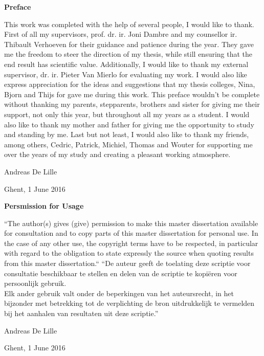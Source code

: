 \newpage

\noindent \textbf{\huge Preface}

\vspace{1.5cm}

\noindent

This work was completed with the help of several people, I would like to thank. First of all my supervisors, prof. dr. ir. Joni Dambre and my counsellor ir. Thibault Verhoeven for their guidance and patience during the year. They gave me the freedom to steer the direction of my thesis, while still ensuring that the end result has scientific value. Additionally, I would like to thank my external supervisor, dr. ir. Pieter Van Mierlo for evaluating my work. I would also like express appreciation for the ideas and suggestions that my thesis colleges, Nina, Bjorn and Thijs for gave me during this work.
\npar
This preface wouldn't be complete without thanking my parents, stepparents, brothers and sister for giving me their support, not only this year, but throughout all my years as a student. I would also like to thank my mother and father for giving me the opportunity to study and standing by me.
\npar
Last but not least, I would also like to thank my friends, among others, Cedric, Patrick, Michiel, Thomas and Wouter for supporting me over the years of my study and creating a pleasant working atmosphere. 

\addvspace{3cm}

\hfill \noindent Andreas De Lille

\hfill \noindent Ghent, 1 June 2016

\clearpage

\noindent \textbf{\huge Persmission for Usage}
\vspace{1.5cm}

\noindent
``The author(s) gives (give) permission to make this master dissertation available for consultation
and to copy parts of this master dissertation for personal use.
 In the case of any other use, the copyright terms have to be respected, in particular with regard to
the obligation to state expressly the source when quoting results from this master dissertation.``
\npar
``De auteur geeft de toelating deze scriptie voor consultatie beschikbaar
te stellen en delen van de scriptie te kopi\"eren voor persoonlijk
gebruik.\\
Elk ander gebruik valt onder de beperkingen van het auteursrecht,
in het bijzonder met betrekking tot de verplichting de bron uitdrukkelijk
te vermelden bij het aanhalen van resultaten uit deze scriptie.''

\addvspace{4cm}

\hfill \noindent Andreas De Lille

\hfill \noindent Ghent, 1 June 2016

